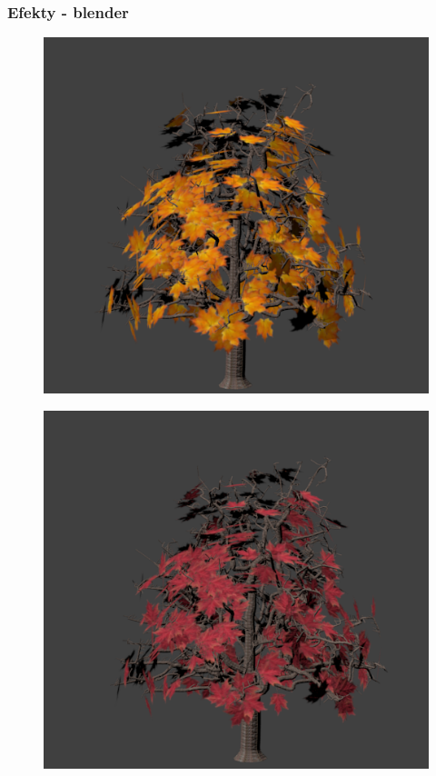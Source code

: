 \documentclass[blue,table]{beamer}
\begin{document}
\begin{frame}\frametitle{Efekty - blender}
\begin{multicols}{3}
\begin{figure}
\includegraphics[scale=0.25]{img/blender/blender16.png} 
\end{figure}
\begin{figure}
\includegraphics[scale=0.25]{img/blender/blender17.png} 

\end{figure}
\end{multicols}
\end{frame}
\end{document}

